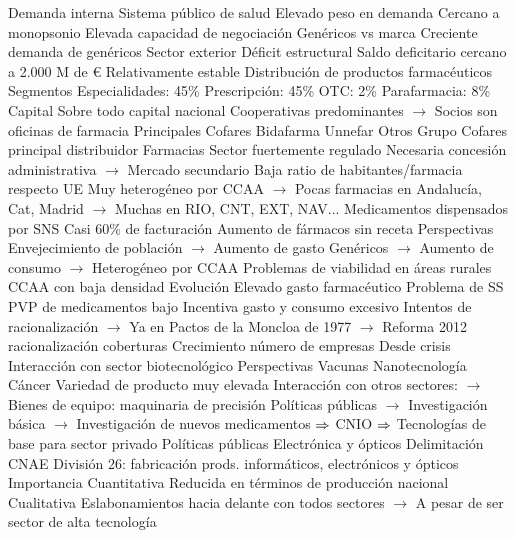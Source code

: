 \documentclass{nuevotema}
\begin{document}
\begin{esquemal}
			\3 Demanda interna
				\4 Sistema público de salud
				\4[] Elevado peso en demanda
				\4[] Cercano a monopsonio
				\4[] Elevada capacidad de negociación
				\4 Genéricos vs marca
				\4[] Creciente demanda de genéricos
			\3 Sector exterior
				\4 Déficit estructural
				\4 Saldo deficitario cercano a 2.000 M de €
				\4[] Relativamente estable
			\3 Distribución de productos farmacéuticos
				\4 Segmentos
				\4[] Especialidades: 45\%
				\4[] Prescripción: 45\%
				\4[] OTC: 2\%
				\4[] Parafarmacia: 8\%
				\4 Capital
				\4[] Sobre todo capital nacional
				\4[] Cooperativas predominantes
				\4[] $\to$ Socios son oficinas de farmacia
				\4 Principales
				\4[] Cofares
				\4[] Bidafarma
				\4[] Unnefar
				\4[] Otros
				\4 Grupo Cofares principal distribuidor
			\3 Farmacias
				\4 Sector fuertemente regulado
				\4[] Necesaria concesión administrativa
				\4[] $\to$ Mercado secundario
				\4 Baja ratio de habitantes/farmacia respecto UE
				\4[] Muy heterogéneo por CCAA
				\4[] $\to$ Pocas farmacias en Andalucía, Cat, Madrid
				\4[] $\to$ Muchas en RIO, CNT, EXT, NAV...
				\4 Medicamentos dispensados por SNS
				\4[] Casi 60\% de facturación
				\4 Aumento de fármacos sin receta
				\4 Perspectivas
				\4[] Envejecimiento de población
				\4[] $\to$ Aumento de gasto
				\4[] Genéricos
				\4[] $\to$ Aumento de consumo
				\4[] $\to$ Heterogéneo por CCAA
				\4 Problemas de viabilidad en áreas rurales
				\4[] CCAA con baja densidad
			\3 Evolución
				\4 Elevado gasto farmacéutico
				\4[] Problema de SS
				\4 PVP de medicamentos bajo
				\4[] Incentiva gasto y consumo excesivo
				\4[] Intentos de racionalización
				\4[] $\to$ Ya en Pactos de la Moncloa de 1977
				\4[] $\to$ Reforma 2012 racionalización coberturas
				\4 Crecimiento número de empresas
				\4[] Desde crisis
				\4[] Interacción con sector biotecnológico
			\3 Perspectivas
				\4 Vacunas
				\4 Nanotecnología
				\4 Cáncer
				\4[] Variedad de producto muy elevada
				\4[] Interacción con otros sectores:
				\4[] $\to$ Bienes de equipo: maquinaria de precisión
				\4[] Políticas públicas
				\4[] $\to$ Investigación básica
				\4[] $\to$ Investigación de nuevos medicamentos
				\4[] $\Rightarrow$ CNIO
				\4[] $\Rightarrow$ Tecnologías de base para sector privado
			\3 Políticas públicas
		\2 Electrónica y ópticos
			\3 Delimitación
				\4 CNAE División 26: fabricación prods. informáticos, electrónicos y ópticos
			\3 Importancia
				\4 Cuantitativa
				\4[] Reducida en términos de producción nacional
				\4 Cualitativa
				\4[] Eslabonamientos hacia delante con todos sectores
				\4[] $\to$ A pesar de ser sector de alta tecnología

\end{esquemal}
\end{document}
